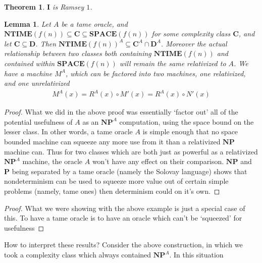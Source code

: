 \documentclass{article}
\theoremstyle{definition}
\theoremstyle{plain}
\theoremstyle{theorem}
\newtheorem{lemma}{Lemma}[section]
\newtheorem{theorem}{Theorem}[section]
\begin{document}
\begin{theorem}
	$\bm{I}$ is Ramsey $1$. 
\end{theorem}
\begin{lemma}
	Let $A$ be a tame oracle, and $\bm{NTIME}(f(n)) \subseteq \bm{C} \subseteq \bm{SPACE}(f(n))$ for some complexity class $\bm{C}$, and let $\bm{C} \subseteq \bm{D}$. Then $\bm{NTIME}(f(n))^A \subseteq \bm{C}^A \cap \bm{D}^A$. Moreover the actual relationship between two classes both containing $\bm{NTIME}(f(n))$ and contained within $\bm{SPACE}(f(n))$ will remain the same relativized to $A$. We have a machine $M^A$, which can be factored into two machines, one relativized, and one unrelativized
	\begin{align}
		M^A(x) = R^A(x) \circ M'(x) = R^A(x) \circ N'(x)
	\end{align}
\end{lemma}
\begin{proof}
	What we did in the above proof was essentially `factor out' all of the potential usefulness of $A$ as an $\bm{NP}^A$ computation, using the space bound on the lesser class. In other words, a tame oracle $A$ is simple enough that no space bounded machine can squeeze any more use from it than a relativized $\bm{NP}$ machine can. Thus for two classes which are both just as powerful as a relativized $\bm{NP}^A$ machine, the oracle $A$ won't have any effect on their comparison. $\bm{NP}$ and $\bm{P}$ being separated by a tame oracle (namely the Solovay language) shows that nondeterminism can be used to squeeze more value out of certain simple problems (namely, tame ones) then determinism could on it's own.  
\end{proof}
\begin{proof}
	What we were showing with the above example is just a special case of this. To have a tame oracle is to have an oracle which can't be `squeezed' for usefulness 
\end{proof}
How to interpret these results? Consider the above construction, in which we took a complexity class which always contained $\bm{NP}^A$. In this situation 
\end{document}

